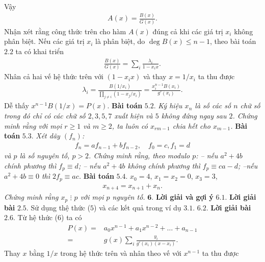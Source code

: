 \begin{multicols}{2}
\begin{align*}
	\end{align*}
	Vậy
	\begin{align*}
		A(x)= \frac{B(x)}{G(x)}.
	\end{align*}
	Nhận xét rằng công thức trên cho hàm $A(x)$ đúng cả khi các giá trị $x_i$ không phân biệt. 
	\vskip 0.1cm	
	Nếu các giá trị $x_i$ là phân biệt, do $\deg B(x)\leq n-1$, theo bài toán $2.2$ ta có khai triển
	\begin{align*}
		\frac{B(x)}{G(x)}=\sum_i\frac{\lambda_i}{1-x_i x}.
	\end{align*}
	Nhân cả hai vế hệ thức trên với $(1-x_ix)$ và thay $x=1/x_i$ ta thu được
	\begin{align*}
		\lambda_i=\frac{B(1/x_i)}{\prod_{j\neq i}(1-x_j/x_i)} = 
		\frac{x_i^{n-1}B(x_i)}{g'(x_i)}.
	\end{align*}
	Dễ thấy {\color{blue} $x^{n-1}B(1/x)=P(x).$}
	\vskip 0.1cm	
	\textbf{\color{hoccungpi}Bài toán} $\pmb{5.2.}$ \textit{Ký hiệu $x_n$ là số các số $n$ chữ số trong đó chỉ có các chữ số $2,3,5,7$ xuất hiện và $5$ không đứng ngay sau $2$. Chứng minh rằng với mọi $r\geq 1$ và $m\geq2$, ta luôn có $x_{rm-1}$ chia hết cho $x_{m-1}$.}
	\vskip 0.1cm
	\textbf{\color{hoccungpi}Bài toán} $\pmb{5.3.}$ \textit{Xét dãy $(f_n)$:
	\begin{align*}
		f_n=a f_{n-1}+b f_{n-2}, \quad f_0=c, f_1=d
	\end{align*}
	và $p$ là số nguyên tố, $p>2$. Chứng minh rằng, theo modulo $p$:
	\vskip 0.1cm
	-- nếu $a^2+4b$ chính phương thì $f_p\equiv d$;
	\vskip 0.1cm 
	-- nếu $a^2+4b$ không chính phương thì $f_p\equiv ca-d$;
	\vskip 0.1cm
	--nếu $a^2+4b\equiv 0$ thì $2f_p\equiv ac$.}
	\vskip 0.1cm
	\textbf{\color{hoccungpi}Bài toán} $\pmb{5.4.}$  $x_0=4$, $x_1=x_2=0$, $x_3=3$,
	\begin{align*}
		x_{n+4}=x_{n+1}+x_n.
	\end{align*}
	\textit{Chứng minh rằng $x_p\,\,\vdots\,\, p$ với mọi $p$ nguyên tố.}
	\vskip 0.1cm	
	$\pmb{6.}$ \textbf{\color{hoccungpi}Lời giải và gợi ý}
	\vskip 0.1cm
	$\pmb{6.1.}$ \textbf{\color{hoccungpi}Lời giải bài} $\pmb{2.5.}$ Sử dụng thệ thức ($5$) và các kết quả trong ví dụ $3.1$. 
	\vskip 0.1cm
	$\pmb{6.2.}$ \textbf{\color{hoccungpi}Lời giải bài} $\pmb{2.6.}$
	Từ hệ thức ($6$) ta có
	\begin{align*}
		P(x)=&a_0x^{n-1}+a_1x^{n-2}+\ldots+a_{n-1}\\
		=&g(x)\sum_i \frac{y_i}{g'(x_i)(x-x_i)}.
	\end{align*}
	Thay $x$ bằng $1/x$ trong hệ thức trên và nhân theo vế với $x^{n-1}$ ta thu được

\end{multicols}

